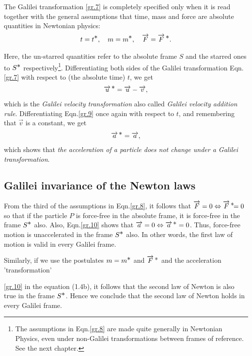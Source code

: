 The Galilei transformation \eqref{gr.7} is completely 
specified only when it is read together with the general 
assumptions that time, mass and force are absolute 
quantities in Newtonian physics:
\begin{align}\label{gr.8}
t=t^{\textstyle \ast},\quad m = m^{\textstyle \ast},\quad \overrightarrow{F} = 
\overrightarrow{F}\,^{\textstyle \ast} .
\end{align}

Here, the un-starred quantities refer to the absolute frame 
$S$ and the starred ones to $S^{\textstyle \ast}$ 
respectively\footnote{The assumptions in Eqn.\eqref{gr.8} 
are made quite generally in Newtonian Physics, even under 
{non-Galilei} transformations between frames of reference. 
See the next chapter.}. Differentiating both sides of the 
Galilei transformation  Eqn.\eqref{gr.7} with respect to 
(the absolute time) $t$, we get
\begin{align}\label{gr.9}
{\overrightarrow{u}^{\,{\ensuremath{\textstyle \ast}}}} = \overrightarrow{u} -\overrightarrow{v},
\end{align}
which is the \textsl{Galilei velocity transformation} also 
called \textsl{Galilei velocity addition rule}. 
Differentiating Eqn.\eqref{gr.9} once again with respect to 
$t$, and remembering that $\vec{v}$ is a constant, we get
\begin{align}\label{gr.10}
{\overrightarrow{a}^{\,{\ensuremath{\textstyle \ast}}}} = \overrightarrow{a},
\end{align}
which shows that \textsl{the acceleration of a particle does 
not change under a Galilei transformation}.

\subsection{Galilei invariance of the Newton 
laws} 

From the third of the assumptions in Eqn.\eqref{gr.8}, it 
follows that $\overrightarrow{F} = 0 \Leftrightarrow{\overrightarrow{F}^{\,{\ensuremath{\textstyle \ast}}}}\hspace*{-4pt} = 0$ 
so that if the particle $P$ is force-free in the absolute 
frame, it is force-free in the frame $S^{\textstyle \ast}$ also. Also, 
Eqn.\eqref{gr.10} shows that $\overrightarrow{a} = 0\Leftrightarrow 
{\overrightarrow{a}^{\,{\ensuremath{\textstyle \ast}}}} = 0$. Thus, force-free motion is unaccelerated in 
the frame $S^{\textstyle \ast}$ also. In other words, the first law of 
motion is valid in every Galilei frame.

Similarly, if we use the postulates $m=m^{\textstyle \ast}$ and 
$ \overrightarrow{F}\,^{\textstyle \ast}$ and the acceleration 'transformation' 
 
\eqref{gr.10} in the equation (1.4b), it follows that  the 
second law of Newton is also true in the frame $S^{\textstyle \ast}$. 
Hence we conclude that the second law of Newton holds in 
every Galilei frame.

